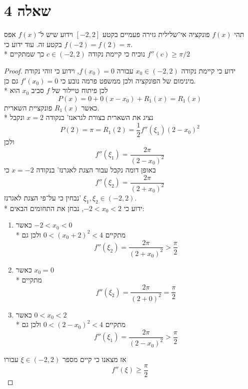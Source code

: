 \section{שאלה 4}
תהי $f(x)$ פונקציה אי־שלילית גזירה פעמיים בקטע $[-2, 2]$ וידוע שיש ל־$f(x)$ אפס בקטע זה. עוד ידוע כי $f(-2) = f(2) = \pi$. \\*
נוכיח כי קיימת נקודה $c \in (-2, 2)$ כך שמתקיים $f''(c) \ge \pi/2$
\begin{proof}
	ידוע כי קיימת נקודה $x_0 \in (-2, 2)$ עבורה $f(x_0) = 0$, וידוע כי זוהי נקודת מינימום של הפונקציה ולכן ממשפט פרמה נובע כי $f'(x_0) = 0$ גם כן. \\*
	לכן פיתוח טיילור של $f$ סביב $x_0$ הוא
	\[
		P(x) = 0 + 0(x - x_0) + R_1(x) = R_1(x)
	\]
	כאשר $R_1(x)$ פונקציית השארית. \\*
	נציג את השארית בצורת לגראנז' בנקודה $x = 2$ ונקבל
	\[
		P(2) = \pi = R_1(2) = \frac{1}{2} f''(\xi_1) {(2 - x_0)}^2
	\]
	ולכן
	\[
		f''(\xi_1) = \frac{2 \pi}{{(2 - x_0)}^2}
	\]
	באופן דומה נקבל עבור הצגת לאגרנז' בנקודה $x = -2$ כי
	\[
		f''(\xi_2) = \frac{2 \pi}{{(2 + x_0)}^2}
	\]
	נבחין כי על־פי הצגת לאגרנז' $\xi_1, \xi_2 \in (-2, 2)$. \\*
	ידוע כי $-2 < x_0 < 2$, נבחן את התחומים הבאים:
	\begin{enumerate}
		\item כאשר $-2 < x_0 < 0$ \\*
			מתקיים $0 < {(x_0 + 2)}^2 < 4$ ולכן גם
			\[
				f''(\xi_2) = \frac{2 \pi}{{(2 + x_0)}^2} > \frac{\pi}{2}
			\]
		\item כאשר $x_0 = 0$ \\*
			מתקיים
			\[
				f''(\xi_2) = \frac{2\pi}{{(2 + 0)}^2} = \frac{\pi}{2}
			\]
		\item כאשר $0 < x_0 < 2$ \\*
			מתקיים $0 < {(2 - x_0)}^2 < 4$ ולכן גם
			\[
				f''(\xi_1) = \frac{2 \pi}{{(2 - x_0)}^2} > \frac{\pi}{2}
			\]
	\end{enumerate}
	אז מצאנו כי קיים מספר $\xi \in (-2, 2)$ עבורו
	\[
		f''(\xi) \ge \frac{\pi}{2}
	\]
\end{proof}

